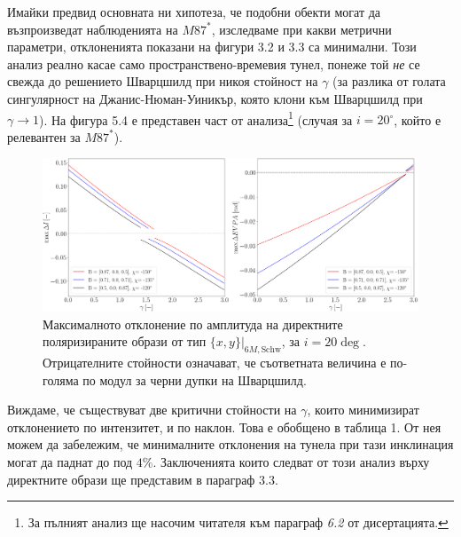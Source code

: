 \documentclass[12pt]{article}
\numberwithin{equation}{section}
\numberwithin{figure}{section}
\begin{document}
	Имайки предвид основната ни хипотеза, че подобни обекти могат да възпроизведат наблюденията на $M87^*$, изследваме при какви метрични параметри, отклоненията показани на фигури 3.2 и 3.3 са минимални. Този анализ реално касае само пространствено-времевия тунел, понеже той \emph{не} се свежда до решението Шварцшилд при никоя стойност на $\gamma$ (за разлика от голата сингулярност на Джанис-Нюман-Уиникър, която клони към Шварцшилд при $\gamma \rightarrow 1$). На фигура 5.4 е представен част от анализа\footnote{За пълният анализ ще насочим читателя към параграф \emph{6.2} от дисертацията.} (случая за $i = 20^\circ$, който е релевантен за $M87^*$).
	
	\begin{figure}[!htb]
		\centering
		\includegraphics[scale = 0.22]{Section_7_Polarized_Emission/WH_20_deg_param_sweep.png}
		\caption[Максималното отклонение на директните поляризираните образи от тип $\{x,y\}\vert_{6M, \text{Schw}}$, за $i = 20\deg$]{\small Максималното отклонение по амплитуда на директните поляризираните образи от тип $\{x,y\}\vert_{6M, \text{Schw}}$, за $i = 20\deg$. Отрицателните стойности означават, че съответната величина е по-голяма по модул за черни дупки на Шварцшилд.} 
		\label{WH_max_deviation_70_deg}
	\end{figure}
	
	Виждаме, че съществуват две критични стойности на $\gamma$, които минимизират отклонението по интензитет, и по наклон. Това е обобщено в таблица 1. От нея можем да забележим, че минималните отклонения на тунела при тази инклинация могат да паднат до под $4\%$. Заключенията които следват от този анализ върху директните образи ще представим в параграф 3.3.
	
\end{document}
